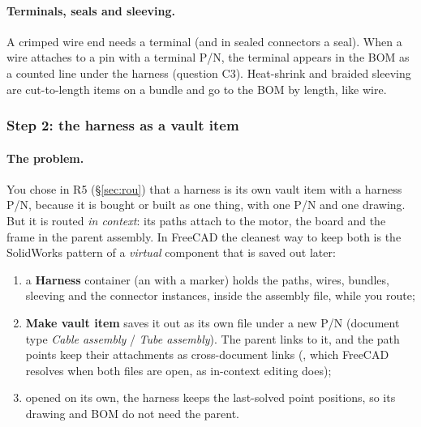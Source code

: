 \paragraph{Terminals, seals and sleeving.} A crimped wire end needs a terminal (and in sealed connectors a
seal). When a wire attaches to a pin with a terminal P/N, the terminal appears in the BOM as a counted line
under the harness (question C3). Heat-shrink and braided sleeving are cut-to-length items on a bundle and go
to the BOM by length, like wire.

\subsubsection*{Step 2: the harness as a vault item}

\paragraph{The problem.} You chose in R5 (\S\ref{sec:rou}) that a harness is its own vault item with a harness
P/N, because it is bought or built as one thing, with one P/N and one drawing. But it is
routed \emph{in context}: its paths attach to the motor, the board and the frame in the parent assembly. In
FreeCAD the cleanest way to keep both is the SolidWorks pattern of a \emph{virtual} component that is saved out
later:
\begin{enumerate}[nosep]
  \item a \textbf{Harness} container (an  with a  marker) holds the paths,
        wires, bundles, sleeving and the connector instances, inside the assembly file, while you route;
  \item \textbf{Make vault item} saves it out as its own file under a new P/N (document type \emph{Cable
        assembly} / \emph{Tube assembly}). The parent links to it, and the path points keep their attachments
        as cross-document links (, which FreeCAD resolves when both files are
        open, as in-context editing  does);
  \item opened on its own, the harness keeps the last-solved point positions, so its drawing and BOM do not
        need the parent.
\end{enumerate}

